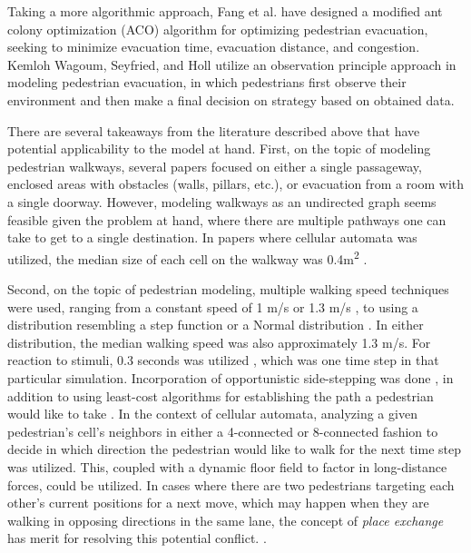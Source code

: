 \documentclass[12pt]{article}
\begin{document}
Taking a more algorithmic approach, Fang et al. \cite{fang2011hierarchical} have
designed a modified ant colony optimization (ACO) algorithm for optimizing
pedestrian evacuation, seeking to minimize evacuation time, evacuation distance,
and congestion. Kemloh Wagoum, Seyfried, and Holl \cite{kemloh2012modeling}
utilize an observation principle approach in modeling pedestrian evacuation,
in which pedestrians first observe their environment and then make a final
decision on strategy based on obtained data.

There are several takeaways from the literature described above that have
potential applicability to the model at hand. First, on the topic of modeling
pedestrian walkways, several papers focused on either a single passageway,
enclosed areas with obstacles (walls, pillars, etc.), or evacuation from a
room with a single doorway. However, modeling walkways as an undirected graph
\cite{fang2011hierarchical} seems feasible given the problem at hand, where
there are multiple pathways one can take to get to a single destination. In
papers where cellular automata was utilized, the median size of each cell on the
walkway was 0.4m\textsuperscript{2}
\cite{blue2001cellular,burstedde2001simulation,weifeng2003simulation}.

Second, on the topic of pedestrian modeling, multiple walking speed techniques
were used, ranging from a constant speed of 1 m/s \cite{weifeng2003simulation}
or 1.3 m/s \cite{burstedde2001simulation}, to using a distribution resembling a
step function \cite{blue2001cellular} or a Normal distribution
\cite{klupfel2005models}. In either distribution, the median walking speed was
also approximately 1.3 m/s. For reaction to stimuli, 0.3 seconds was utilized
\cite{burstedde2001simulation}, which was one time step in that particular
simulation. Incorporation of opportunistic side-stepping was done
\cite{blue2001cellular}, in addition to using least-cost algorithms for
establishing the path a pedestrian would like to take
\cite{fang2011hierarchical}. In the context of cellular automata, analyzing a
given pedestrian's cell's neighbors in either a 4-connected
\cite{weifeng2003simulation} or 8-connected fashion
\cite{burstedde2001simulation} to decide in which direction the pedestrian would
like to walk for the next time step was utilized. This, coupled with a dynamic
floor field \cite{burstedde2001simulation} to factor in long-distance forces,
could be utilized. In cases where there are two pedestrians targeting each other's
current positions for a next move, which may happen when they are walking in
opposing directions in the same lane, the concept of \textit{place exchange}
has merit for resolving this potential conflict. \cite{blue2001cellular}.
\end{document}
